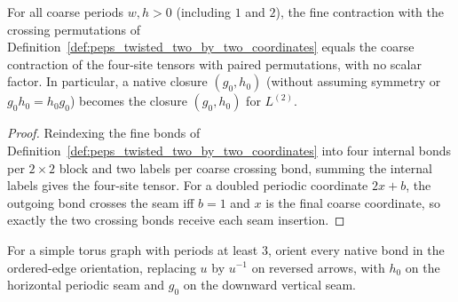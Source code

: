 \begin{lemma}%
    \label{thm:peps_twisted_two_by_two_geometry}
    \leanok
    For all coarse periods $w,h>0$ (including $1$ and $2$), the fine
    contraction with the crossing permutations of
    Definition~\ref{def:peps_twisted_two_by_two_coordinates} equals the coarse
    contraction of the four-site tensors with paired permutations, with no
    scalar factor. In particular, a native closure $(g_0,h_0)$ (without
    assuming symmetry or $g_0h_0=h_0g_0$) becomes the closure $(g_0,h_0)$ for
    $L^{(2)}$.
\end{lemma}
\begin{proof}\leanok
    Reindexing the fine bonds of Definition~\ref{def:peps_twisted_two_by_two_coordinates}
    into four internal bonds per $2\times2$ block and two labels per coarse
    crossing bond, summing the internal labels gives the four-site tensor. For
    a doubled periodic coordinate $2x+b$, the outgoing bond crosses the seam
    iff $b=1$ and $x$ is the final coarse coordinate, so exactly the two
    crossing bonds receive each seam insertion.
\end{proof}

\begin{definition}%
    \label{def:peps_twisted_torus_ordered_labels}
    \leanok
    For a simple torus graph with periods at least $3$, orient every native
    bond in the ordered-edge orientation, replacing $u$ by $u^{-1}$ on reversed
    arrows, with $h_0$ on the horizontal periodic seam and $g_0$ on the
    downward vertical seam.
\end{definition}

